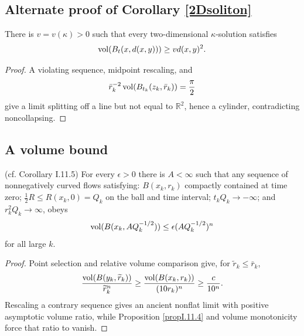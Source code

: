 \subsection{Alternate proof of Corollary \ref{2Dsoliton}}
\label{altpf11.3}
\begin{lemma}
\label{lem:kl-alternate-proof-corollary-2dsoliton-using-proposition-propi-11-4-corolla-existence-kappa-solutions}

\label{2dvol}
There is $v=v(\kappa)>0$ such that every two-dimensional $\kappa$-solution
satisfies
\begin{equation}\label{volnotsmall}
\operatorname{vol}(B_t(x,d(x,y)))\geq v d(x,y)^2.
\end{equation}
\end{lemma}
\begin{proof}
\sketch A violating sequence, midpoint rescaling, and
\begin{equation}\label{halfvol}
\bar r_k^{-2}\operatorname{vol}(B_{t_k}(z_k,\bar r_k))=\frac\pi2
\end{equation}
give a limit splitting off a
line but not equal to $\mathbb R^2$, hence a cylinder, contradicting
noncollapsing.
\end{proof}
\subsection{A volume bound}
\begin{corollary}
\label{cor:kl-volume-bound-existence-curvature-operators}

(cf. Corollary I.11.5) \label{corI.11.5}
For every $\epsilon>0$ there is $A<\infty$ such that any sequence of
nonnegatively curved flows satisfying: $B(x_k,r_k)$ compactly contained at
time zero; $\frac12R\leq R(x_k,0)=Q_k$ on the ball and time interval;
$t_kQ_k\to-\infty$; and $r_k^2Q_k\to\infty$, obeys
\[
\operatorname{vol}(B(x_k,AQ_k^{-1/2}))\leq\epsilon(AQ_k^{-1/2})^n
\]
for all large $k$.
\end{corollary}
\begin{proof}
\sketch Point selection and relative volume comparison give, for
$\widetilde r_k\leq\bar r_k$,
\begin{equation}\label{volbig}
\frac{\operatorname{vol}(B(y_k,\widetilde r_k))}{\widetilde r_k^n}
\geq\frac{\operatorname{vol}(B(x_k,r_k))}{(10r_k)^n}\geq\frac{c}{10^n}.
\end{equation}
Rescaling a contrary sequence gives an ancient nonflat limit with
positive asymptotic volume ratio, while Proposition \ref{propI.11.4} and
volume monotonicity force that ratio to vanish.
\end{proof}

